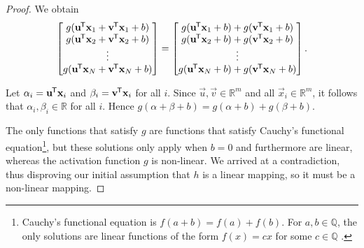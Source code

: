 \begin{proof}
    We obtain
    \begin{equation*}
        \begin{bmatrix}
            g(\mathbf{u}^{\mkern-1.5mu\mathsf{T}} \mathbf{x}_1 + \mathbf{v}^{\mkern-1.5mu\mathsf{T}} \mathbf{x}_1 + b) \\
            g(\mathbf{u}^{\mkern-1.5mu\mathsf{T}} \mathbf{x}_2 + \mathbf{v}^{\mkern-1.5mu\mathsf{T}} \mathbf{x}_2 + b) \\
            \vdots \\
            g(\mathbf{u}^{\mkern-1.5mu\mathsf{T}} \mathbf{x}_N + \mathbf{v}^{\mkern-1.5mu\mathsf{T}} \mathbf{x}_N + b) \\
        \end{bmatrix}
        = \begin{bmatrix}
            g(\mathbf{u}^{\mkern-1.5mu\mathsf{T}} \mathbf{x}_1 + b) + g(\mathbf{v}^{\mkern-1.5mu\mathsf{T}} \mathbf{x}_1 + b) \\
            g(\mathbf{u}^{\mkern-1.5mu\mathsf{T}} \mathbf{x}_2 + b) + g(\mathbf{v}^{\mkern-1.5mu\mathsf{T}} \mathbf{x}_2 + b) \\
            \vdots \\
            g(\mathbf{u}^{\mkern-1.5mu\mathsf{T}} \mathbf{x}_N + b) + g(\mathbf{v}^{\mkern-1.5mu\mathsf{T}} \mathbf{x}_N + b) \\
        \end{bmatrix}.
    \end{equation*}

    Let $\alpha_i = \mathbf{u}^{\mkern-1.5mu\mathsf{T}} \mathbf{x}_i$ and $\beta_i = \mathbf{v}^{\mkern-1.5mu\mathsf{T}} \mathbf{x}_i$ for all $i$.
    Since $\vec{u},\vec{v} \in \mathbb{R}^m$ and all $\vec{x}_i \in \mathbb{R}^m$, it follows that $\alpha_i, \beta_i \in \mathbb{R}$ for all $i$.
    Hence $g(\alpha + \beta + b) = g(\alpha + b) + g(\beta + b)$.

    The only functions that satisfy $g$ are functions that satisfy Cauchy's functional equation\footnote{Cauchy's functional equation is $f(a+b)=f(a)+f(b)$. For $a,b \in \mathbb{Q}$, the only solutions are linear functions of the form $f(x) = cx$ for some $c \in \mathbb{Q}$ \cite{reem2017}.}, but these solutions only apply when $b=0$ and furthermore are linear, whereas the activation function $g$ is non-linear. 
    We arrived at a contradiction, thus disproving our initial assumption that $h$ is a linear mapping, so it must be a non-linear mapping.
\end{proof}

